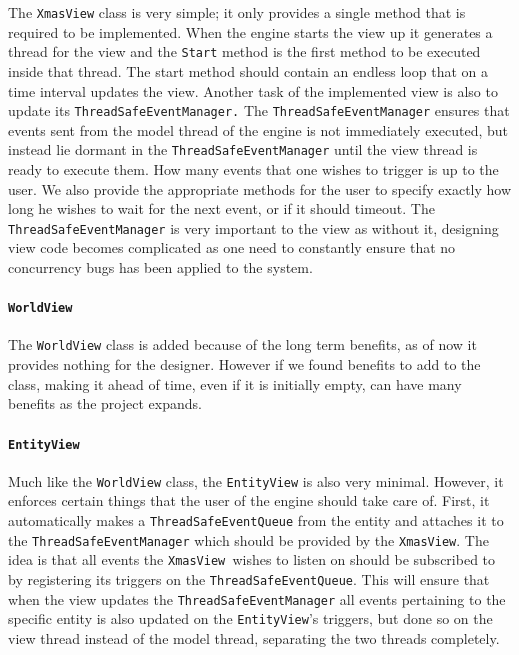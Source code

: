The \texttt{XmasView} class is very simple; it only provides a single
method that is required to be implemented. When the engine starts
the view up it generates a thread for the view and the \texttt{Start}
method is the first method to be executed inside that thread. The
start method should contain an endless loop that on a time interval
updates the view. Another task of the implemented view is also to
update its \texttt{ThreadSafeEventManager.} The \texttt{ThreadSafeEventManager}
ensures that events sent from the model thread of the engine is not
immediately executed, but instead lie dormant in the \texttt{ThreadSafeEventManager}
until the view thread is ready to execute them. How many events that
one wishes to trigger is up to the user. We also provide the appropriate
methods for the user to specify exactly how long he wishes to wait
for the next event, or if it should timeout. The \texttt{ThreadSafeEventManager}
is very important to the view as without it, designing view code becomes
complicated as one need to constantly ensure that no concurrency bugs
has been applied to the system.


\paragraph*{\texttt{WorldView}}

The \texttt{WorldView} class is added because of the long term benefits,
as of now it provides nothing for the designer. However if we found
benefits to add to the class, making it ahead of time, even if it
is initially empty, can have many benefits as the project expands.


\paragraph*{\texttt{EntityView}}

Much like the \texttt{WorldView} class, the \texttt{EntityView} is
also very minimal. However, it enforces certain things that the user
of the engine should take care of. First, it automatically makes a
\texttt{ThreadSafeEventQueue} from the entity and attaches it to the
\texttt{ThreadSafeEventManager} which should be provided by the \texttt{XmasView}.
The idea is that all events the \texttt{XmasView }wishes to listen
on should be subscribed to by registering its triggers on the \texttt{ThreadSafeEventQueue}.
This will ensure that when the view updates the \texttt{ThreadSafeEventManager}
all events pertaining to the specific entity is also updated on the
\texttt{EntityView}\textquoteright{}s triggers, but done so on the
view thread instead of the model thread, separating the two threads
completely.



